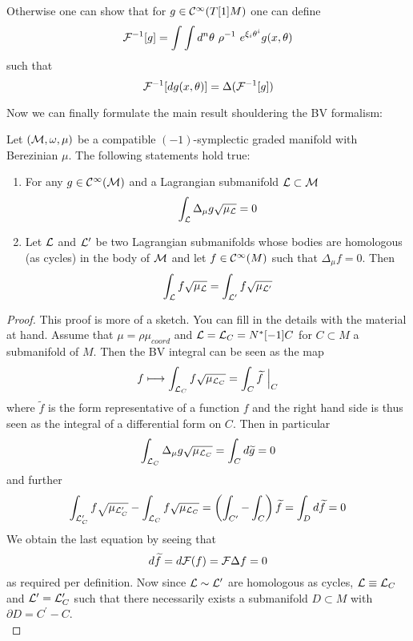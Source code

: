 Otherwise one can show that for $g \in \mathcal{C}^{\infty}(T[1]M)$ one can define
\begin{equation}
  \FF^{-1}[g] = \int \int d^n \theta \ \rho^{-1} \ e^{\xi_i \theta^i} g(x, \theta)
\end{equation}
such that
\begin{equation}
  {\mathcal{F}}^{-1}[dg(x, \theta)] = \Delta({\mathcal{F}}^{-1}[g])
\end{equation}

Now we can finally formulate the main result shouldering the BV formalism:

\begin{theo}
  Let $(\mathcal{M}, \omega, \mu)$ be a compatible $(-1)$-symplectic graded manifold with Berezinian $\mu$. The following statements hold true:
  \begin{enumerate}
    \item For any $g \in \mathcal{C}^{\infty}(\mathcal{M})$ and a Lagrangian submanifold $\mathcal{L} \subset \mathcal{M}$
    \begin{equation}
      \int_{\mathcal{L}} \Delta_\mu g \sqrt{\mu_{\mathcal{L}}} = 0
    \end{equation}

    \item Let $\mathcal{L}$ and $\mathcal{L}^\prime$ be two Lagrangian submanifolds whose bodies are homologous (as cycles) in the body of $\mathcal{M}$ and let $f \in \mathcal{C}^{\infty}(M)$ such that $\Delta_\mu f = 0$. Then
    \begin{equation}
      \int_{\mathcal{L}} f \sqrt{\mu_{\mathcal{L}}} = \int_{\mathcal{L}^\prime} f \sqrt{\mu_{\mathcal{L}^\prime}}
    \end{equation}
  \end{enumerate}
\begin{proof}
  This proof is more of a sketch. You can fill in the details with the material at hand. Assume that $\mu = \rho \mu_{coord}$ and $\mathcal{L} = \mathcal{L}_C = N^*[-1]C$ for $C \subset M$ a submanifold of $M$. Then the BV integral can be seen as the map
  \begin{equation}
    f \longmapsto \int_{\mathcal{L}_C} f \sqrt{\mu_{\mathcal{L}_C}} = \int_C \widetilde{f}\ \Big|_C
  \end{equation}
  where $\widetilde{f}$ is the form representative of a function $f$ and the right hand side is thus seen as the integral of a differential form on $C$. Then in particular
  \begin{equation}
    \int_{\mathcal{L}_C} \Delta_\mu g \sqrt{\mu_{\mathcal{L}_C}} = \int_C d\widetilde{g} = 0
  \end{equation}
  and further
  \begin{equation}
    \int_{\mathcal{L}^\prime_C} f \sqrt{\mu_{\mathcal{L}^\prime_C}} - \int_{\mathcal{L}_C} f \sqrt{\mu_{\mathcal{L}_C}} = \left( \int_{C^\prime} - \int_{C} \right) \widetilde{f} = \int_D d\widetilde{f} = 0
  \end{equation}
  We obtain the last equation by seeing that
  \begin{equation}
    d \widetilde{f} = d {\mathcal{F}}(f) = {\mathcal{F}} \Delta f = 0
  \end{equation}
  as required per definition. Now since $\mathcal{L} \sim \mathcal{L}^\prime$ are homologous as cycles, $\mathcal{L} \equiv \mathcal{L}_C$ and $\mathcal{L}^\prime = \mathcal{L}^\prime_C$ such that there necessarily exists a submanifold $D \subset M$ with $\partial D = C^\prime - C$.\\


\end{proof}
\end{theo}
